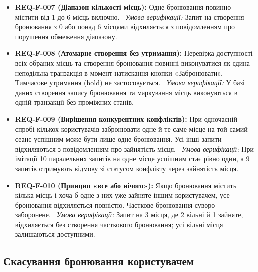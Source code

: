 \begin{itemize}[leftmargin=*,labelindent=0pt]
    \item \textbf{REQ-F-007 (Діапазон кількості місць):} Одне бронювання повинно містити від 1 до 6 місць включно.~
    \textit{Умова верифікації:} Запит на створення бронювання з 0 або понад 6 місцями відхиляється з повідомленням про порушення обмеження діапазону.
    
    \item \textbf{REQ-F-008 (Атомарне створення без утримання):} Перевірка доступності всіх обраних місць та створення бронювання повинні виконуватися як єдина неподільна транзакція в момент натискання кнопки «Забронювати». Тимчасове утримання (hold) не застосовується.~
    \textit{Умова верифікації:} У базі даних створення запису бронювання та маркування місць виконуються в одній транзакції без проміжних станів.
    
    \item \textbf{REQ-F-009 (Вирішення конкурентних конфліктів):} При одночасній спробі кількох користувачів забронювати одне й те саме місце на той самий сеанс успішним може бути лише одне бронювання. Усі інші запити відхиляються з повідомленням про зайнятість місця.~
    \textit{Умова верифікації:} При імітації 10 паралельних запитів на одне місце успішним стає рівно один, а 9 запитів отримують відмову зі статусом конфлікту через зайнятість місця.
    
    \item \textbf{REQ-F-010 (Принцип «все або нічого»):} Якщо бронювання містить кілька місць і хоча б одне з них уже зайняте іншим користувачем, усе бронювання відхиляється повністю. Часткове бронювання суворо заборонене.~
    \textit{Умова верифікації:} Запит на 3 місця, де 2 вільні й 1 зайняте, відхиляється без створення часткового бронювання; усі вільні місця залишаються доступними.
\end{itemize}

\subsection{Скасування бронювання користувачем}\label{sec:funktsional-skasuvannia-user}

